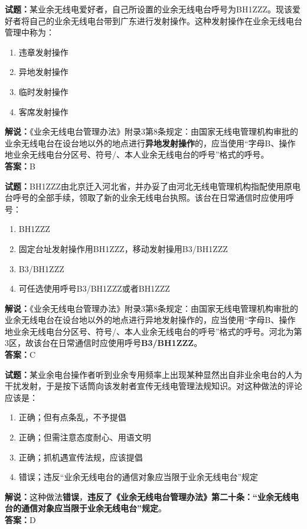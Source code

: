 \documentclass{ctexbook}
\begin{document}
\bigskip


\noindent\textbf{试题：}某业余无线电爱好者，自己所设置的业余无线电台呼号为BH1ZZZ。现该爱好者将自己的业余无线电台带到广东进行发射操作。这种发射操作在业余无线电台管理中称为：
\begin{enumerate}[leftmargin=3em]
	\item 违章发射操作
	\item 异地发射操作
	\item 临时发射操作
	\item 客席发射操作
\end{enumerate}
\noindent\textbf{解说：}《业余无线电台管理办法》附录3第8条规定：由国家无线电管理机构审批的业余无线电台在设台地以外的地点进行\textbf{异地发射操作}的，应当使用“字母B、操作地业余无线电台分区号、符号/、本人业余无线电台的呼号”格式的呼号。\\\noindent\textbf{答案：}B





\bigskip


\noindent\textbf{试题：}BH1ZZZ由北京迁入河北省，并办妥了由河北无线电管理机构指配使用原电台呼号的全部手续，领取了新的业余无线电台执照。该台在日常通信时应使用呼号：
\begin{enumerate}[leftmargin=3em]
	\item BH1ZZZ
	\item 固定台址发射操作用BH1ZZZ，移动发射操用B3/BH1ZZZ
	\item B3/BH1ZZZ
	\item 可任选使用呼号B3/BH1ZZZ或者BH1ZZZ
\end{enumerate}
\noindent\textbf{解说：}《业余无线电台管理办法》附录3第8条规定：由国家无线电管理机构审批的业余无线电台在设台地以外的地点进行异地发射操作的，应当使用“字母B、操作地业余无线电台分区号、符号/、本人业余无线电台的呼号”格式的呼号。河北为第3区，故该台在日常通信时应使用呼号\textbf{B3/BH1ZZZ}。\\\noindent\textbf{答案：}C



\bigskip


\noindent\textbf{试题：}某业余电台操作者听到业余专用频率上出现某种显然出自非业余电台的人为干扰发射，于是按下话筒向该发射者宣传无线电管理法规知识。对这种做法的评论应该是：
\begin{enumerate}[leftmargin=3em]
	\item 正确；但有点条乱，不予提倡
	\item 正确；但需注意态度耐心、用语文明
	\item 正确；抓机遇宣传法规，应该提倡
	\item 错误；违反“业余无线电台的通信对象应当限于业余无线电台”规定
\end{enumerate}
\noindent\textbf{解说：}这种做法\textbf{错误}，\textbf{违反了《业余无线电台管理办法》第二十条：“业余无线电台的通信对象应当限于业余无线电台”规定}。\\\noindent\textbf{答案：}D
\end{document}
